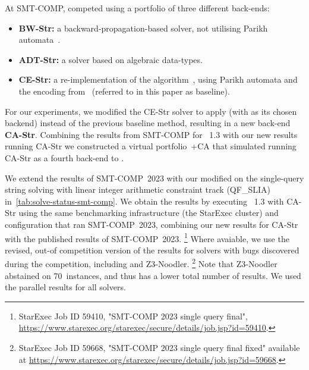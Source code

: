  At SMT-COMP, \Ostrich{} competed using a portfolio of three different
 back-ends:
\begin{itemize}
\item \textbf{BW-Str:} a backward-propagation-based solver, not utilising
  Parikh automata~\cite{ostrich}.
\item \textbf{ADT-Str:} a solver based on algebraic data-types.
\item \textbf{CE-Str:} a re-implementation of the \OstrichPlus{}
  algorithm~\cite{ostrich-plus}, using Parikh automata and the
  encoding from~\cite{generate-parikh-image} (referred to in this paper as baseline).
\end{itemize}

For our experiments, we modified the CE-Str solver to apply \Catra{}
 (with \Calculus{} as its chosen backend)
instead of the previous baseline method, resulting in a new back-end
\textbf{CA-Str}. Combining the results from SMT-COMP for \Ostrich{}~1.3 
with our new results running CA-Str we constructed a virtual 
portfolio~\Ostrich{}+CA that simulated running CA-Str as a fourth
back-end to \Ostrich{}.

%
%

We extend the results of SMT-COMP~2023 with our modified \Ostrich{}
on the single-query string solving with linear integer arithmetic constraint
track (QF\_SLIA) in~\cref{tab:solve-status-smt-comp}. We obtain
the results by executing \Ostrich{}~1.3 with CA-Str using
the same benchmarking infrastructure (the StarExec cluster)
and configuration that ran SMT-COMP~2023, combining our new results for CA-Str with the
published results of SMT-COMP~2023.
\footnote{StarExec Job ID 59410, "SMT-COMP 2023 single query final", 
\url{https://www.starexec.org/starexec/secure/details/job.jsp?id=59410}.} 
Where avaiable, we use the revised, out-of
competition version of the results for solvers with bugs discovered during
the competition, including \Ostrich{} and Z3-Noodler. 
\footnote{StarExec Job ID 59668, "SMT-COMP 2023 single query final fixed" available at
\url{https://www.starexec.org/starexec/secure/details/job.jsp?id=59668}.}
Note that Z3-Noodler abstained on 70~instances, and thus has a lower total number of results.
We used the parallel results for all solvers.

